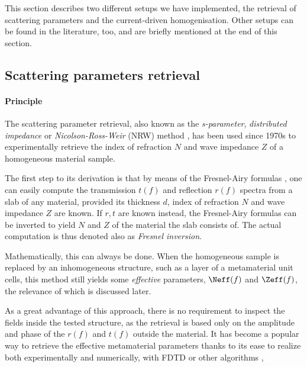 This section describes two different setups we have implemented, the retrieval of scattering parameters and the current-driven homogenisation. Other setups can be found in the literature, too, and are briefly mentioned at the end of this section.
\subsection{Scattering parameters retrieval}
\label{chapter_sparam}
\paragraph{Principle} %
The scattering parameter retrieval, also known as the \textit{s-parameter}, \textit{distributed impedance} or \textit{Nicolson-Ross-Weir} (NRW) method \cite{nicolson1970measurement, weir1974automatic}, has been used since 1970s to experimentally retrieve the index of refraction $N$ and wave impedance $Z$ of a homogeneous material sample.

The first step to its derivation is that by means of the Fresnel-Airy formulas \cite[p. 329]{born1999book},
one can easily compute the transmission $t(f)$ and reflection $r(f)$ spectra from a slab of any material, provided its thickness $d$, index of refraction $N$ and wave impedance $Z$ are known.  If $r,t$ are known instead, the Fresnel-Airy formulas can be inverted to yield $N$ and $Z$ of the material the slab consists of. The actual computation is thus denoted also as \textit{Fresnel inversion}.

Mathematically, this can always be done. When the homogeneous sample is replaced by an inhomogeneous structure, such as a layer of a metamaterial unit cells, this method still yields some \textit{effective} parameters, $\Neff(f)$ and $\Zeff(f)$, the relevance of which is discussed later. 

As a great advantage of this approach, there is no requirement to inspect the fields inside the tested structure, as the retrieval is based only on the amplitude and phase of the  $r(f)$ and $t(f)$ outside the material. It has become a popular way to retrieve the effective metamaterial parameters thanks to its ease to realize both experimentally and numerically, with FDTD or other algorithms \cite{terao2011},

